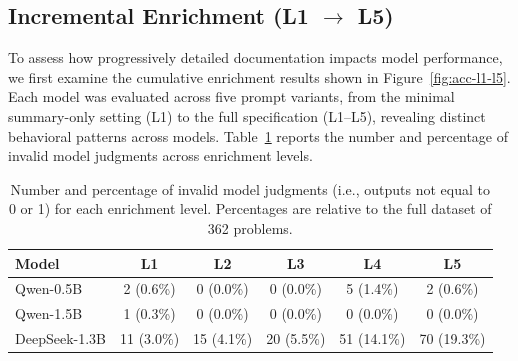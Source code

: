 \documentclass[a4paper]{usiinfbachelorproject}
\begin{document}
\subsection{Incremental Enrichment (L1 $\rightarrow$ L5)}

To assess how progressively detailed documentation impacts model performance, we first examine the cumulative enrichment results shown in Figure~\ref{fig:acc-l1-l5}. Each model was evaluated across five prompt variants, from the minimal summary-only setting (L1) to the full specification (L1–L5), revealing distinct behavioral patterns across models. Table~\ref{tab:invalid-judgments} reports the number and percentage of invalid model judgments across enrichment levels.


\noindent
\begin{table}[htbp]
\centering
\caption{Number and percentage of invalid model judgments (i.e., outputs not equal to 0 or 1) for each enrichment level. Percentages are relative to the full dataset of 362 problems.}
\vspace{0.5em}
\begin{tabular}{lccccc}
\toprule
\textbf{Model} & \textbf{L1} & \textbf{L2} & \textbf{L3} & \textbf{L4} & \textbf{L5} \\
\midrule
Qwen-0.5B & 2 (0.6\%) & 0 (0.0\%) & 0 (0.0\%) & 5 (1.4\%) & 2 (0.6\%) \\
Qwen-1.5B & 1 (0.3\%) & 0 (0.0\%) & 0 (0.0\%) & 0 (0.0\%) & 0 (0.0\%) \\
DeepSeek-1.3B & 11 (3.0\%) & 15 (4.1\%) & 20 (5.5\%) & 51 (14.1\%) & 70 (19.3\%) \\
\bottomrule
\end{tabular}
\label{tab:invalid-judgments}
\end{table}
\vspace{-1em}
\noindent
\end{document}
